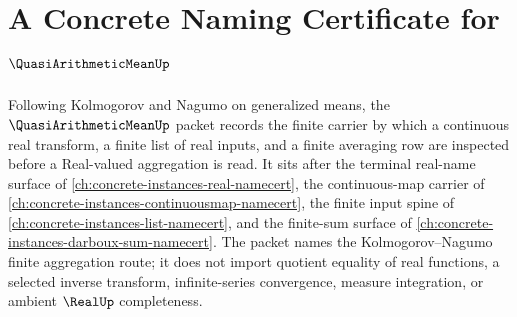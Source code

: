 \chapter{A Concrete Naming Certificate for $\QuasiArithmeticMeanUp$}
\label{ch:concrete-instances-quasi-arithmetic-mean-namecert}

Following Kolmogorov and Nagumo on generalized means, the $\QuasiArithmeticMeanUp$ packet records the finite carrier by which a continuous real transform, a finite list of real inputs, and a finite averaging row are inspected before a Real-valued aggregation is read. It sits after the terminal real-name surface of \autoref{ch:concrete-instances-real-namecert}, the continuous-map carrier of \autoref{ch:concrete-instances-continuousmap-namecert}, the finite input spine of \autoref{ch:concrete-instances-list-namecert}, and the finite-sum surface of \autoref{ch:concrete-instances-darboux-sum-namecert}. The packet names the Kolmogorov--Nagumo finite aggregation route; it does not import quotient equality of real functions, a selected inverse transform, infinite-series convergence, measure integration, or ambient $\RealUp$ completeness.


